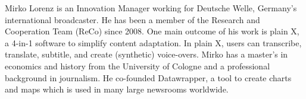 Mirko Lorenz is an Innovation Manager working for Deutsche Welle, Germany's international broadcaster. He has been a member of the Research and Cooperation Team (ReCo) since 2008. One main outcome of his work is plain X, a 4-in-1 software to simplify content adaptation. In plain X, users can transcribe, translate, subtitle, and create (synthetic) voice-overs. 
Mirko has a master's in economics and history from the University of Cologne and a professional background in journalism. He co-founded Datawrapper, a tool to create charts and maps which is used in many large newsrooms worldwide.
